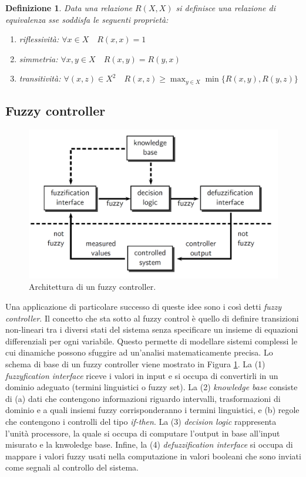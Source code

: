 \documentclass[10pt,a4paper]{article}
\newtheorem{definition}{Definizione}
\begin{document}
\begin{definition}
Data una relazione $R(X,X)$ si definisce una \emph{relazione di equivalenza} sse soddisfa le seguenti proprietà:
\begin{enumerate}
\item{\emph{riflessività}: $\forall x \in X \quad R(x,x) = 1$ }
\item{\emph{simmetria}: $\forall x,y \in X \quad R(x,y) = R(y,x)$ }
\item{\emph{transitività}: $\forall (x,z) \in X^2 \quad R(x,z) \geq \max_{y \in X} \min \{ R(x,y),R(y,z) \}$ }
\end{enumerate}
\end{definition}

\subsection{Fuzzy controller}

\begin{figure}
\centering
\includegraphics[scale=0.3]{img/fuzzycontroller.png}
\caption{Architettura di un fuzzy controller.}
\label{fig:30}
\end{figure}

Una applicazione di particolare successo di queste idee sono i così detti \emph{fuzzy controller}. Il concetto che sta sotto al fuzzy control è quello di definire transizioni non-lineari tra i diversi stati del sistema senza specificare un insieme di equazioni differenziali per ogni variabile. Questo permette di modellare sistemi complessi le cui dinamiche possono sfuggire ad un'analisi matematicamente precisa. Lo schema di base di un fuzzy controller viene mostrato in Figura \ref{fig:30}. La (1) \emph{fuzzyfication interface} riceve i valori in input e si occupa di convertirli in un dominio adeguato (termini linguistici o fuzzy set). La (2) \emph{knowledge base} consiste di (a) dati che contengono informazioni riguardo intervalli, trasformazioni di dominio e a quali insiemi fuzzy corrisponderanno i termini linguistici, e (b) regole che contengono i controlli del tipo \emph{if-then}. La (3) \emph{decision logic} rappresenta l'unità processore, la quale si occupa di computare l'output in base all'input misurato e la knwoledge base. Infine, la (4) \emph{defuzzification interface} si occupa di mappare i valori fuzzy usati nella computazione in valori booleani che sono inviati come segnali al controllo del sistema. 
\end{document}
